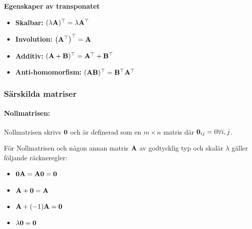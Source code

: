 \begin{features}
	\textbf{Egenskaper av transponatet}

	\begin{itemize}
		\item \textbf{Skalbar:} $(\lambda\mathbf{A})^\top=\lambda\mathbf{A}^\top$
		\item \textbf{Involution:} $\qty(\mathbf{A}^\top)^\top=\mathbf{A}$
		\item \textbf{Additiv:} $(\mathbf{A}+\mathbf{B})^\top=\mathbf{A}^\top+\mathbf{B}^\top$
		\item \textbf{Anti-homomorfism:} $(\mathbf{A}\mathbf{B})^\top=\mathbf{B}^\top\mathbf{A}^\top$
	\end{itemize}
\end{features}

\subsubsection{Särskilda matriser}

\paragraph{Nollmatrisen:} Nollmatrisen skrivs $\mathbf{0}$ och är definerad som en
$m\times n$ matris där $\mathbf{0}_{ij}=0\forall i,j$.

För Nollmatrisen och någon annan matris $\mathbf{A}$ av godtycklig typ och skalär $\lambda$
gäller följande räckneregler:
\begin{itemize}
	\item $\mathbf{0}\mathbf{A}=\mathbf{A}\mathbf{0}=\mathbf{0}$
	\item $\mathbf{A}+\mathbf{0}=\mathbf{A}$
	\item $\mathbf{A}+(-1)\mathbf{A}=\mathbf{0}$
	\item $\lambda\mathbf{0}=\mathbf{0}$
\end{itemize}

